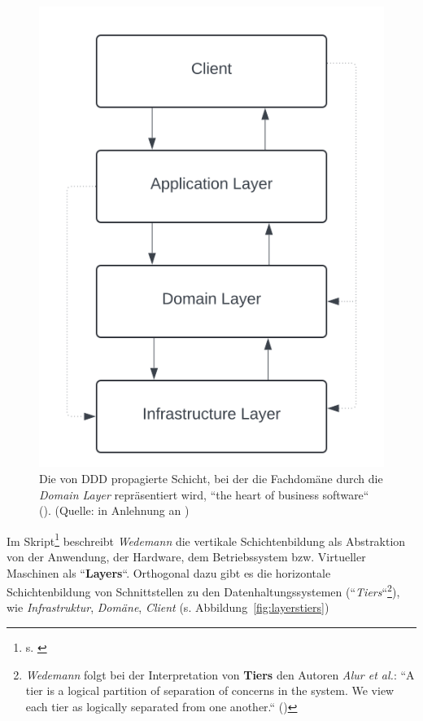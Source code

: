 \begin{figure}
    \centering
    \includegraphics[scale=0.4]{part two/Objektorientierte Analyse/img/layeredarchitecture}
    \caption{Die von DDD propagierte Schicht, bei der die Fachdomäne durch die \textit{Domain Layer} repräsentiert wird, ``the heart of business software`` (\cite[70]{Eva03}). (Quelle: in Anlehnung an \cite[68]{Eva03})}
    \label{fig:layeredarchitecture}
\end{figure}

\noindent
Im Skript\footnote{s. \cite[42]{Wed09b}} beschreibt \textit{Wedemann} die vertikale Schichtenbildung als Abstraktion von der Anwendung, der Hardware, dem Betriebssystem bzw. Virtueller Maschinen als ``\textbf{Layers}``.
Orthogonal dazu gibt es die horizontale Schichtenbildung von Schnittstellen zu den Datenhaltungssystemen (``\textit{Tiers}``\footnote{
\textit{Wedemann} folgt bei der Interpretation von \textbf{Tiers} den Autoren \textit{Alur et al.}: ``A tier is a logical partition of separation of concerns in the system. We view each tier as logically separated from one another.`` (\cite[120]{ACM03})
}), wie \textit{Infrastruktur}, \textit{Domäne}, \textit{Client} (s. Abbildung~\ref{fig:layerstiers})

